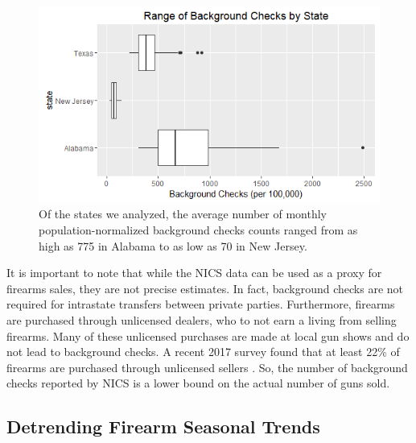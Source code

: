 \documentclass[9pt,twocolumn,twoside,lineno]{pnas-new}
\begin{document}
\begin{figure}%
  \centering
  \includegraphics[width=\linewidth]{figures/boxplot}
  \caption{Of the states we analyzed, the average number of monthly population-normalized background checks counts ranged from as high as 775 in Alabama to as low as 70 in New Jersey.}
  \label{fig:boxplot}
\end{figure}
	It is important to note that while the NICS data can be used as a proxy for firearms sales, they are not precise estimates. In fact, background checks are not required for intrastate transfers between private parties. Furthermore, firearms are purchased through unlicensed dealers, who to not earn a living from selling firearms. Many of these unlicensed purchases are made at local gun shows and do not lead to background checks. A recent 2017 survey found that at least 22\% of firearms are purchased through unlicensed sellers \cite{miller_firearm_2017}. So, the number of background checks reported by NICS is a lower bound on the actual number of guns sold.
    
\subsection*{Detrending Firearm Seasonal Trends}
\end{document}
